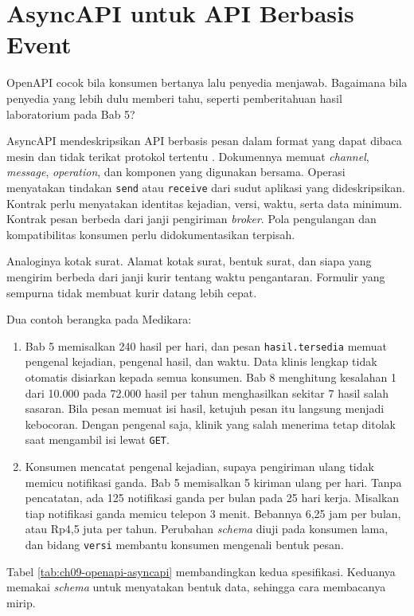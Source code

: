 \section{AsyncAPI untuk API Berbasis Event}

OpenAPI cocok bila konsumen bertanya lalu penyedia menjawab. Bagaimana bila penyedia yang lebih dulu memberi tahu, seperti pemberitahuan hasil laboratorium pada Bab 5?

AsyncAPI mendeskripsikan API berbasis pesan dalam format yang dapat dibaca mesin dan tidak terikat protokol tertentu \cite{asyncapi31}. Dokumennya memuat \textit{channel}, \textit{message}, \textit{operation}, dan komponen yang digunakan bersama. Operasi menyatakan
tindakan \texttt{send} atau \texttt{receive} dari sudut aplikasi yang dideskripsikan. Kontrak perlu menyatakan identitas kejadian, versi, waktu, serta data minimum. Kontrak pesan berbeda dari janji pengiriman \textit{broker}. Pola pengulangan dan kompatibilitas konsumen perlu
didokumentasikan terpisah.

Analoginya kotak surat. Alamat kotak surat, bentuk surat, dan siapa yang mengirim berbeda dari janji kurir tentang waktu pengantaran. Formulir yang sempurna tidak membuat kurir datang lebih cepat.

Dua contoh berangka pada Medikara:
\begin{enumerate}
  \item Bab 5 memisalkan 240 hasil per hari, dan pesan \texttt{hasil.tersedia} memuat pengenal kejadian, pengenal hasil, dan waktu. Data klinis lengkap tidak otomatis disiarkan kepada semua konsumen. Bab 8 menghitung kesalahan 1 dari 10.000 pada 72.000 hasil per tahun menghasilkan
        sekitar 7 hasil salah sasaran. Bila pesan memuat isi hasil, ketujuh pesan itu langsung menjadi kebocoran. Dengan pengenal saja, klinik yang salah menerima tetap ditolak saat mengambil isi lewat \texttt{GET}.
  \item Konsumen mencatat pengenal kejadian, supaya pengiriman ulang tidak memicu notifikasi ganda. Bab 5 memisalkan 5 kiriman ulang per hari. Tanpa pencatatan, ada 125 notifikasi ganda per bulan pada 25 hari kerja. Misalkan tiap notifikasi ganda memicu telepon 3 menit. Bebannya
        6,25 jam per bulan, atau Rp4,5 juta per tahun. Perubahan \textit{schema} diuji pada konsumen lama, dan bidang \texttt{versi} membantu konsumen mengenali bentuk pesan.
\end{enumerate}

Tabel \ref{tab:ch09-openapi-asyncapi} membandingkan kedua spesifikasi. Keduanya memakai \textit{schema} untuk menyatakan bentuk data, sehingga cara membacanya mirip.

